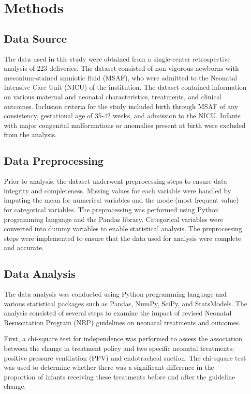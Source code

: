 \documentclass[11pt]{article}
\begin{document}
\section*{Methods}

\subsection*{Data Source}
The data used in this study were obtained from a single-center retrospective analysis of 223 deliveries. The dataset consisted of non-vigorous newborns with meconium-stained amniotic fluid (MSAF), who were admitted to the Neonatal Intensive Care Unit (NICU) of the institution. The dataset contained information on various maternal and neonatal characteristics, treatments, and clinical outcomes. Inclusion criteria for the study included birth through MSAF of any consistency, gestational age of 35-42 weeks, and admission to the NICU. Infants with major congenital malformations or anomalies present at birth were excluded from the analysis.

\subsection*{Data Preprocessing}
Prior to analysis, the dataset underwent preprocessing steps to ensure data integrity and completeness. Missing values for each variable were handled by imputing the mean for numerical variables and the mode (most frequent value) for categorical variables. The preprocessing was performed using Python programming language and the Pandas library. Categorical variables were converted into dummy variables to enable statistical analysis. The preprocessing steps were implemented to ensure that the data used for analysis were complete and accurate.

\subsection*{Data Analysis}
The data analysis was conducted using Python programming language and various statistical packages such as Pandas, NumPy, SciPy, and StatsModels. The analysis consisted of several steps to examine the impact of revised Neonatal Resuscitation Program (NRP) guidelines on neonatal treatments and outcomes.

First, a chi-square test for independence was performed to assess the association between the change in treatment policy and two specific neonatal treatments: positive pressure ventilation (PPV) and endotracheal suction. The chi-square test was used to determine whether there was a significant difference in the proportion of infants receiving these treatments before and after the guideline change.
\end{document}
